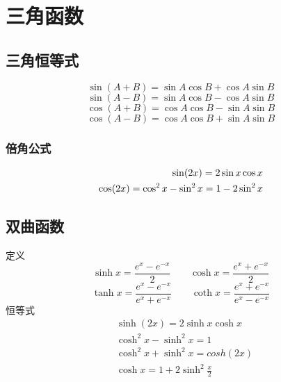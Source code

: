 \section{三角函数}
\subsection{三角恒等式}
$$\sin(A+B)= \sin A\cos B+\cos A\sin B$$
$$\sin(A-B)= \sin A\cos B-\cos A\sin B$$
$$\cos(A+B)= \cos A\cos B-\sin A\sin B$$
$$\cos(A-B)= \cos A\cos B+\sin A\sin B$$
\subsubsection{倍角公式}
\begin{displaymath}
    \centering
    \begin{split}
        \sin(2x)=2\sin x\cos x\\
        \cos(2x)=\cos^2x-\sin^2x=1-2\sin^2 x
    \end{split}
\end{displaymath}
\subsection{双曲函数}
定义
$$\sinh x = \frac{e^x-e^{-x}}{2}\qquad \cosh x = \frac{e^x+e^{-x}}{2}$$
$$\tanh x = \frac{e^x-e^{-x}}{e^x+e^{-x}}\qquad \coth x = \frac{e^x+e^{-x}}{e^x-e^{-x}}$$
恒等式
\begin{align}
&\sinh (2x) = 2\sinh x\cosh x \label{eq:hyperbolic_functions_1} \\
&\cosh^2x-\sinh^2x = 1 \label{eq:hyperbolic_functions_2} \\
&\cosh^2x+\sinh^2x = cosh (2x) \label{eq:hyperbolic_functions_3} \\
&\cosh x = 1+2\sinh^2\frac{x}{2} \label{eq:hyperbolic_functions_4}
\end{align}
